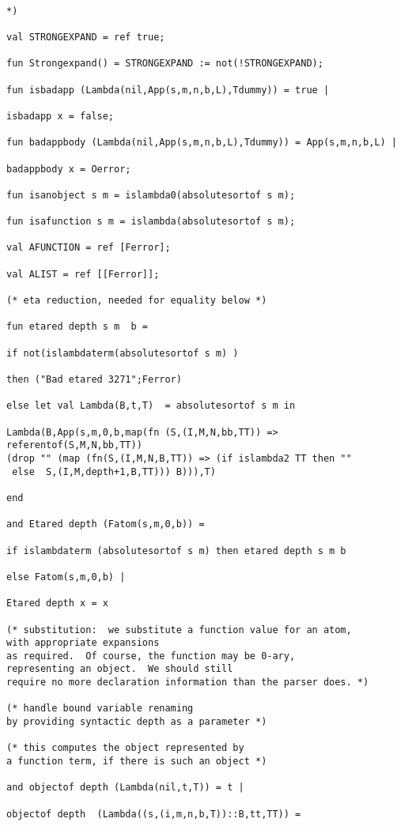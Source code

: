 \documentclass[12pt]{article}
\begin{document}
\begin{verbatim}

*)

val STRONGEXPAND = ref true;

fun Strongexpand() = STRONGEXPAND := not(!STRONGEXPAND);

fun isbadapp (Lambda(nil,App(s,m,n,b,L),Tdummy)) = true |

isbadapp x = false;

fun badappbody (Lambda(nil,App(s,m,n,b,L),Tdummy)) = App(s,m,n,b,L) |

badappbody x = Oerror;

fun isanobject s m = islambda0(absolutesortof s m);

fun isafunction s m = islambda(absolutesortof s m);

val AFUNCTION = ref [Ferror];

val ALIST = ref [[Ferror]];

(* eta reduction, needed for equality below *)

fun etared depth s m  b =

if not(islambdaterm(absolutesortof s m) )

then ("Bad etared 3271";Ferror)

else let val Lambda(B,t,T)  = absolutesortof s m in

Lambda(B,App(s,m,0,b,map(fn (S,(I,M,N,bb,TT)) => 
referentof(S,M,N,bb,TT))
(drop "" (map (fn(S,(I,M,N,B,TT)) => (if islambda2 TT then ""
 else  S,(I,M,depth+1,B,TT))) B))),T)

end

and Etared depth (Fatom(s,m,0,b)) =

if islambdaterm (absolutesortof s m) then etared depth s m b

else Fatom(s,m,0,b) |

Etared depth x = x

(* substitution:  we substitute a function value for an atom, 
with appropriate expansions
as required.  Of course, the function may be 0-ary, 
representing an object.  We should still
require no more declaration information than the parser does. *)

(* handle bound variable renaming 
by providing syntactic depth as a parameter *)

(* this computes the object represented by
a function term, if there is such an object *)

and objectof depth (Lambda(nil,t,T)) = t |

objectof depth  (Lambda((s,(i,m,n,b,T))::B,tt,TT)) =


\end{verbatim}
\end{document}
